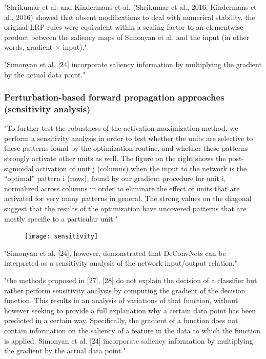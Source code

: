 	"Shrikumar et al. and Kindermans et al. (Shrikumar et al., 2016; Kindermans et al., 2016) showed that absent modifications to deal with numerical stability, the original LRP rules were equivalent within a scaling factor to an elementwise product between the saliency maps of Simonyan et al. and the input (in other words, gradient × input)." \cite{Shrikumar2017}
	
	"Simonyan et al. [24] incorporate saliency information by multiplying the gradient by the actual data point." \cite{Montavon2017}
		
		\subsubsection{Perturbation-based forward propagation approaches (sensitivity analysis)}
		"To further test the robustness of the activation maximization method, we perform a sensitivity analysis in order to test whether the units are selective to these patterns found by the optimization routine, and whether these patterns strongly activate other units as well. The figure on the right shows the post-sigmoidal activation of unit j (columns) when the input to the network is the “optimal” pattern i (rows), found by our gradient procedure for unit i, normalized across columns in order to eliminate the effect of units that are activated for very many patterns in general. The strong values on the diagonal suggest that the results of the optimization have uncovered patterns that are mostly specific to a particular unit." \cite{Erhan2009}
		\begin{figure}[h]
			\centering
			\texttt{[image: sensitivity]}
		\end{figure}
		
		"Simonyan et al. [24], however, demonstrated that DeConvNets can be interpreted as a sensitivity analysis of the network input/output relation." \cite{Mahendran2015}
		
		"the methods proposed in [27], [28] do not explain the decision of a classifier but rather perform sensitivity analysis by computing the gradient of the decision function. This results in an analysis of variations of that function, without however seeking to provide a full explanation why a certain data point has been predicted in a certain way. Specifically, the gradient of a function does not contain information on the saliency of a feature in the data to which the function is applied. Simonyan et al. [24] incorporate saliency information by multiplying the gradient by the actual data point." \cite{Montavon2017}
		
